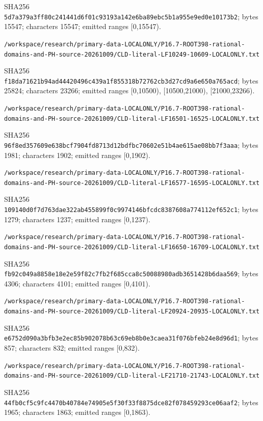 \documentclass[11pt]{article}
\begin{document}
SHA256 \texttt{5d7a379a3ff80c241441d6f01c93193a142e6ba89ebc5b1a955e9ed0e10173b2}; bytes 15547; characters 15547; emitted ranges [0,15547).

\texttt{/\allowbreak workspace/\allowbreak research/\allowbreak primary-data-LOCALONLY/\allowbreak P16.7-ROOT398-rational-domains-and-PH-source-20261009/\allowbreak CLD-literal-LF10249-10609-LOCALONLY.txt}

SHA256 \texttt{f18da71621b94ad44420496c439a1f855318b72762cb3d27cd9a6e650a765acd}; bytes 25824; characters 23266; emitted ranges [0,10500), [10500,21000), [21000,23266).

\texttt{/\allowbreak workspace/\allowbreak research/\allowbreak primary-data-LOCALONLY/\allowbreak P16.7-ROOT398-rational-domains-and-PH-source-20261009/\allowbreak CLD-literal-LF16501-16525-LOCALONLY.txt}

SHA256 \texttt{96f8ed357609e638bcf7904fd8713d12bdfbc70602e51b4ae615ae08bb7f3aaa}; bytes 1981; characters 1902; emitted ranges [0,1902).

\texttt{/\allowbreak workspace/\allowbreak research/\allowbreak primary-data-LOCALONLY/\allowbreak P16.7-ROOT398-rational-domains-and-PH-source-20261009/\allowbreak CLD-literal-LF16577-16595-LOCALONLY.txt}

SHA256 \texttt{109140d0f7d763dae322ab455899f0c9974146bfcdc8387608a774112ef652c1}; bytes 1279; characters 1237; emitted ranges [0,1237).

\texttt{/\allowbreak workspace/\allowbreak research/\allowbreak primary-data-LOCALONLY/\allowbreak P16.7-ROOT398-rational-domains-and-PH-source-20261009/\allowbreak CLD-literal-LF16650-16709-LOCALONLY.txt}

SHA256 \texttt{fb92c049a8858e18e2e59f82c7fb2f685cca8c50088980adb3651428b6daa569}; bytes 4306; characters 4101; emitted ranges [0,4101).

\texttt{/\allowbreak workspace/\allowbreak research/\allowbreak primary-data-LOCALONLY/\allowbreak P16.7-ROOT398-rational-domains-and-PH-source-20261009/\allowbreak CLD-literal-LF20924-20935-LOCALONLY.txt}

SHA256 \texttt{e6752d090a3bfb3e2ec85b902078b63c69eb8b0e3caea31f076bfeb24e8d96d1}; bytes 857; characters 832; emitted ranges [0,832).

\texttt{/\allowbreak workspace/\allowbreak research/\allowbreak primary-data-LOCALONLY/\allowbreak P16.7-ROOT398-rational-domains-and-PH-source-20261009/\allowbreak CLD-literal-LF21710-21743-LOCALONLY.txt}

SHA256 \texttt{44fb0cf5c9fc4470b40784e74905e5f30f33f8875dce82f078459293ce06aaf2}; bytes 1965; characters 1863; emitted ranges [0,1863).
\end{document}

